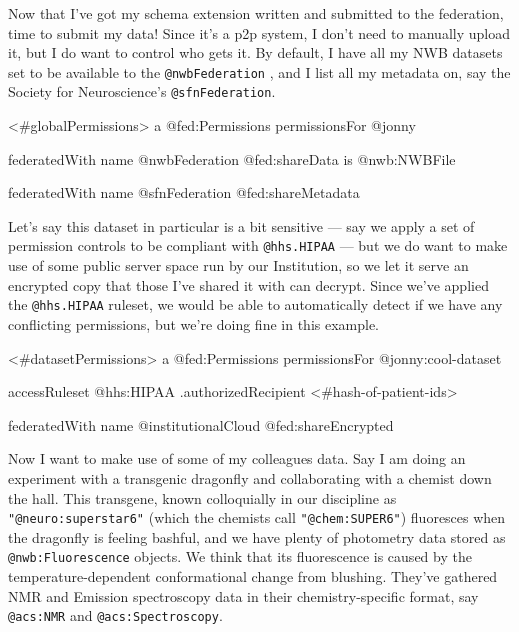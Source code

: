 \documentclass[10pt]{article}
\newenvironment{Shaded}{}{}
\newcommand{\NormalTok}[1]{#1}
\begin{document}
\begin{multicols}{2}
Now that I've got my schema extension written and submitted to the
federation, time to submit my data! Since it's a p2p system, I don't
need to manually upload it, but I do want to control who gets it. By
default, I have all my NWB datasets set to be available to the
\texttt{@nwbFederation} , and I list all my metadata on, say the Society
for Neuroscience's \texttt{@sfnFederation}.

\begin{Shaded}
\begin{Highlighting}[]
\NormalTok{\textless{}\#globalPermissions\textgreater{}}
\NormalTok{  a @fed:Permissions}
\NormalTok{  permissionsFor @jonny}

\NormalTok{  federatedWith }
\NormalTok{    name @nwbFederation}
\NormalTok{    @fed:shareData }
\NormalTok{      is @nwb:NWBFile}

\NormalTok{  federatedWith}
\NormalTok{    name @sfnFederation}
\NormalTok{    @fed:shareMetadata}
\end{Highlighting}
\end{Shaded}

Let's say this dataset in particular is a bit sensitive --- say we apply
a set of permission controls to be compliant with \texttt{@hhs.HIPAA}
--- but we do want to make use of some public server space run by our
Institution, so we let it serve an encrypted copy that those I've shared
it with can decrypt. Since we've applied the \texttt{@hhs.HIPAA}
ruleset, we would be able to automatically detect if we have any
conflicting permissions, but we're doing fine in this example.

\begin{Shaded}
\begin{Highlighting}[]
\NormalTok{\textless{}\#datasetPermissions\textgreater{}}
\NormalTok{  a @fed:Permissions}
\NormalTok{  permissionsFor @jonny:cool{-}dataset}

\NormalTok{  accessRuleset @hhs:HIPAA}
\NormalTok{    .authorizedRecipient \textless{}\#hash{-}of{-}patient{-}ids\textgreater{}}
  
\NormalTok{  federatedWith}
\NormalTok{    name @institutionalCloud}
\NormalTok{    @fed:shareEncrypted}
\end{Highlighting}
\end{Shaded}

Now I want to make use of some of my colleagues data. Say I am doing an
experiment with a transgenic dragonfly and collaborating with a chemist
down the hall. This transgene, known colloquially in our discipline as
\texttt{"@neuro:superstar6"} (which the chemists call
\texttt{"@chem:SUPER6"}) fluoresces when the dragonfly is feeling
bashful, and we have plenty of photometry data stored as
\texttt{@nwb:Fluorescence} objects. We think that its fluorescence is
caused by the temperature-dependent conformational change from blushing.
They've gathered NMR and Emission spectroscopy data in their
chemistry-specific format, say \texttt{@acs:NMR} and
\texttt{@acs:Spectroscopy}.


\end{multicols}
\end{document}
